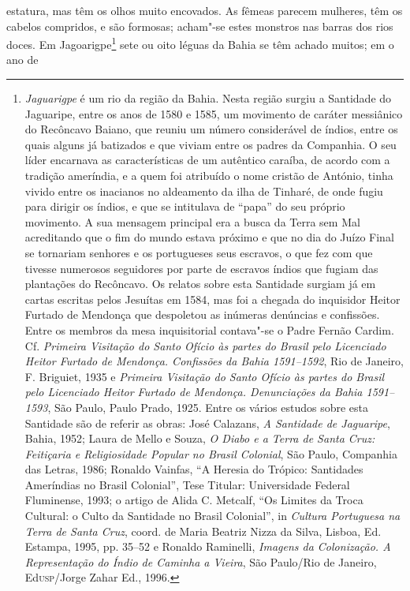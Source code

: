 estatura, mas têm os olhos muito encovados. As fêmeas parecem mulheres,
têm os cabelos compridos, e são formosas; acham"-se estes monstros nas
barras dos rios doces. Em Jagoarigpe\footnote{ \textit{Jaguarigpe} é
um rio da região da Bahia. Nesta região surgiu a Santidade do
Jaguaripe, entre os anos de 1580 e 1585, um movimento de caráter
messiânico do Recôncavo Baiano, que reuniu um número considerável de
índios, entre os quais alguns já batizados e que viviam entre os
padres da Companhia. O seu líder encarnava as características de um
autêntico caraíba, de acordo com a tradição ameríndia, e a quem foi
atribuído o nome cristão de António, tinha vivido entre os inacianos no
aldeamento da ilha de Tinharé, de onde fugiu para dirigir os índios, e
que se intitulava de ``papa'' do seu próprio movimento. A sua mensagem
principal era a busca da Terra sem Mal acreditando que o fim do mundo
estava próximo e que no dia do Juízo Final se tornariam senhores e os
portugueses seus escravos, o que fez com que tivesse numerosos
seguidores por parte de escravos índios que fugiam das plantações do
Recôncavo. Os relatos sobre esta Santidade surgiam já em cartas
escritas pelos Jesuítas em 1584, mas foi a chegada do inquisidor Heitor
Furtado de Mendonça que despoletou as inúmeras denúncias e confissões.
Entre os membros da mesa inquisitorial contava"-se o Padre Fernão
Cardim. Cf. \textit{Primeira Visitação do Santo Ofício às partes do
Brasil pelo Licenciado Heitor Furtado de Mendonça. Confissões da Bahia
1591--1592}, Rio de Janeiro, F. Briguiet, 1935 e \textit{Primeira
Visitação do Santo Ofício às partes do Brasil pelo Licenciado Heitor
Furtado de Mendonça. Denunciações da Bahia 1591--1593}, São Paulo, Paulo
Prado, 1925. Entre os vários estudos sobre esta Santidade são de
referir as obras: José Calazans, \textit{A Santidade de Jaguaripe}, 
Bahia, 1952; Laura de Mello e Souza, \textit{O Diabo e a Terra de
Santa Cruz: Feitiçaria e Religiosidade Popular no Brasil Colonial}, 
São Paulo, Companhia das Letras, 1986; Ronaldo Vainfas, ``A Heresia do 
Trópico: Santidades Ameríndias no Brasil Colonial'', Tese Titular:
Universidade Federal Fluminense, 1993; o artigo de Alida C. Metcalf, ``Os 
Limites da Troca Cultural: o Culto da Santidade no Brasil Colonial'',
in \textit{Cultura Portuguesa na Terra de Santa Cruz}, coord. de Maria
Beatriz Nizza da Silva, Lisboa, Ed. Estampa, 1995, pp. 35--52 e Ronaldo
Raminelli, \textit{Imagens da Colonização. A Representação do Índio de
Caminha a Vieira}, São Paulo/Rio de Janeiro, Ed\textsc{usp}/Jorge Zahar Ed.,
1996.} sete ou oito léguas da Bahia se têm achado muitos; em o ano de
